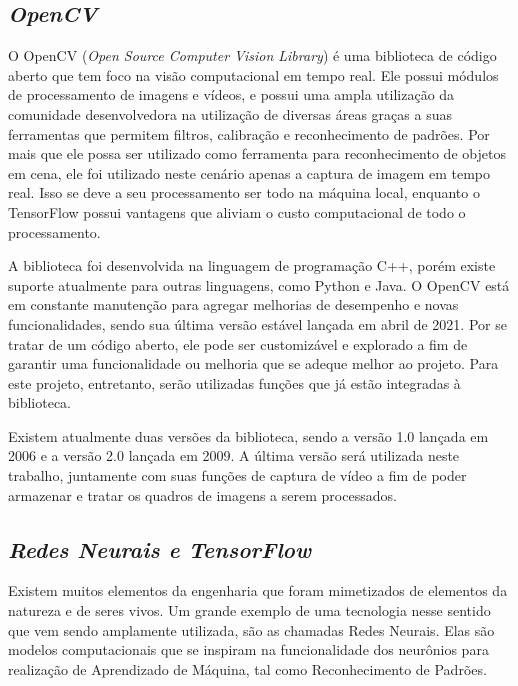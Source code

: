 \subsection{\textit{OpenCV}}\label{sec:Cap3_D_OpenCV}
 
O OpenCV (\textit{Open Source Computer Vision Library}) é uma biblioteca de código aberto que tem foco na visão computacional em tempo real. Ele possui módulos de processamento de imagens e vídeos, e possui uma ampla utilização da comunidade desenvolvedora na utilização de diversas áreas graças a suas ferramentas que permitem filtros, calibração e reconhecimento de padrões. Por mais que ele possa ser utilizado como ferramenta para reconhecimento de objetos em cena, ele foi utilizado neste cenário apenas a captura de imagem em tempo real. Isso se deve a seu processamento ser todo na máquina local, enquanto o TensorFlow possui vantagens que aliviam o custo computacional de todo o processamento.

A biblioteca foi desenvolvida na linguagem de programação C++, porém existe suporte atualmente para outras linguagens, como Python e Java. O OpenCV está em constante manutenção para agregar melhorias de desempenho e novas funcionalidades, sendo sua última versão estável lançada em abril de 2021. Por se tratar de um código aberto, ele pode ser customizável e explorado a fim de garantir uma funcionalidade ou melhoria que se adeque melhor ao projeto. Para este projeto, entretanto, serão utilizadas funções que já estão integradas à biblioteca.

Existem atualmente duas versões da biblioteca, sendo a versão 1.0 lançada em 2006 e a versão 2.0 lançada em 2009. A última versão será utilizada neste trabalho, juntamente com suas funções de captura de vídeo a fim de poder armazenar e tratar os quadros de imagens a serem processados.
 
\subsection{\textit{Redes Neurais e TensorFlow}}\label{sec:Cap3_D_TensorFlow}

Existem muitos elementos da engenharia que foram mimetizados de elementos da natureza e de seres vivos. Um grande exemplo de uma tecnologia nesse sentido que vem sendo amplamente utilizada, são as chamadas Redes Neurais. Elas são modelos computacionais que se inspiram na funcionalidade dos neurônios para realização de Aprendizado de Máquina, tal como Reconhecimento de Padrões.

